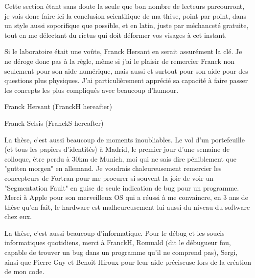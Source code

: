 Cette section étant sans doute la seule que bon nombre de lecteurs parcourront, je vais donc faire ici la conclusion scientifique de ma thèse, point par point, dans un style aussi soporifique que possible, et en latin, juste par méchanceté gratuite, tout en me délectant du rictus qui doit déformer vos visages à cet instant. 




Si le laboratoire était une voûte, Franck Hersant en serait assurément la clé. Je ne déroge donc pas à la règle, même si j'ai le plaisir de remercier Franck non seulement pour son aide numérique, mais aussi et surtout pour son aide pour des questions plus physiques. J'ai particulièrement apprécié sa capacité à faire passer les concepts les plus compliqués avec beaucoup d'humour.

Franck Hersant (FranckH hereafter)


Franck Selsis (FranckS hereafter)



La thèse, c'est aussi beaucoup de moments inoubliables. Le vol d'un portefeuille (et tous les papiers d'identités) à Madrid, le premier jour d'une semaine de colloque, être perdu à 30km de Munich, moi qui ne sais dire péniblement que "gutten morgen" en allemand. Je voudrais chaleureusement remercier les concepteurs de Fortran pour me procurer si souvent la joie de voir un "Segmentation Fault" en guise de seule indication de bug pour un programme. Merci à Apple pour son merveilleux OS qui a réussi à me convaincre, en 3 ans de thèse qu'en fait, le hardware est malheureusement lui aussi du niveau du software chez eux. 

La thèse, c'est aussi beaucoup d'informatique. Pour le débug et les soucis informatiques quotidiens, merci à FranckH, Romuald (dit le débugueur fou, capable de trouver un bug dans un programme qu'il ne comprend pas), Sergi, ainsi que Pierre Gay et Benoit Hiroux pour leur aide préciseuse lors de la création de mon code. 

